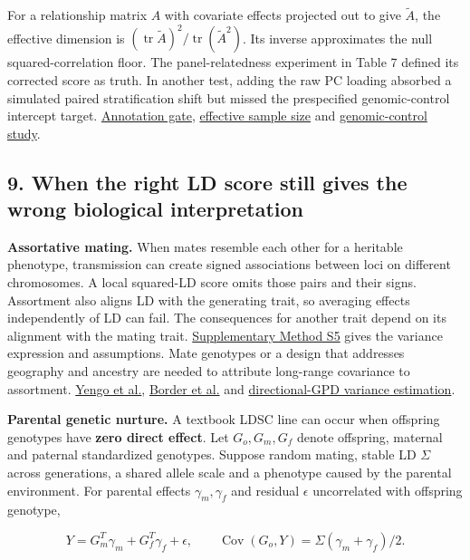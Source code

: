 \documentclass[11pt,a4paper]{article}
\let\reportsection\subsection
\newif\ifinsupplement
\renewcommand{\subsection}[1]{\clearpage
  \ifstrequal{#1}{Supplementary Methods}{\insupplementtrue
    \fancyhead[R]{\small\sffamily Supplementary methods}}{}
  \reportsection{#1}}
\begin{document}
For a relationship matrix \(A\) with covariate effects projected out to give \(\tilde A\), the effective dimension is \((\operatorname{tr}\tilde A)^2/\operatorname{tr}(\tilde A^2)\). Its inverse approximates the null squared-correlation floor. The panel-relatedness experiment in Table 7 defined its corrected score as truth. In another test, adding the raw PC loading absorbed a simulated paired stratification shift but missed the prespecified genomic-control intercept target. \href{../docs/D1_ANNOTATION_GATE.md}{Annotation gate}, \href{../experiments/relatedness_effective_df.py}{effective sample size} and \href{../experiments/gc_vs_stratification.py}{genomic-control study}.

\subsection{9. When the right LD score still gives the wrong biological interpretation}\label{9-when-the-right-ld-score-still-gives-the-wrong-biological-interpretation}

\textbf{Assortative mating.} When mates resemble each other for a heritable phenotype, transmission can create signed associations between loci on different chromosomes. A local squared-LD score omits those pairs and their signs. Assortment also aligns LD with the generating trait, so averaging effects independently of LD can fail. The consequences for another trait depend on its alignment with the mating trait. \hyperref[s5-biological-interpretation-of-the-slope]{Supplementary Method S5} gives the variance expression and assumptions. Mate genotypes or a design that addresses geography and ancestry are needed to attribute long-range covariance to assortment. \href{https://doi.org/10.1038/s41562-018-0476-3}{Yengo et al.}, \href{https://doi.org/10.1038/s41467-022-28294-9}{Border et al.} and \href{https://doi.org/10.1038/s41588-025-02192-4}{directional-GPD variance estimation}.

\textbf{Parental genetic nurture.} A textbook LDSC line can occur when offspring genotypes have \textbf{zero direct effect}. Let \(G_o,G_m,G_f\) denote offspring, maternal and paternal standardized genotypes. Suppose random mating, stable LD \(\Sigma\) across generations, a shared allele scale and a phenotype caused by the parental environment. For parental effects \(\gamma_m,\gamma_f\) and residual \(\epsilon\) uncorrelated with offspring genotype,

\[
 Y=G_m^T\gamma_m+G_f^T\gamma_f+\epsilon,\qquad
 \operatorname{Cov}(G_o,Y)=\Sigma(\gamma_m+\gamma_f)/2. \tag{6}
\]
\end{document}
